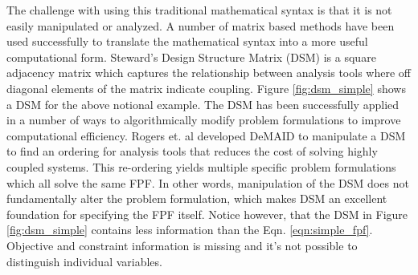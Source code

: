     The challenge with using this traditional mathematical syntax is that it is not easily manipulated or analyzed. 
    A number of matrix based methods have been used successfully to translate the mathematical syntax into a more useful computational form. 
    Steward's Design Structure Matrix (DSM) is a square adjacency matrix which captures the relationship between analysis tools where off 
    diagonal elements of the matrix indicate coupling\cite{Steward1981}. Figure \ref{fig:dsm_simple} shows a DSM for the above notional example. 
    The DSM has been successfully applied in a number of ways to algorithmically modify problem formulations to 
    improve computational efficiency. Rogers et. al developed DeMAID to manipulate a
    DSM  to find an ordering for analysis tools that reduces the cost of solving highly coupled systems\cite{Rogers1996}. This re-ordering yields
    multiple specific problem formulations which all solve the same FPF. In other words, manipulation of the DSM does not fundamentally alter
    the problem formulation, which makes DSM an excellent foundation for specifying the FPF itself. Notice however, that the DSM in 
    Figure \ref{fig:dsm_simple} contains less information than the Eqn. \ref{eqn:simple_fpf}. Objective and constraint information 
    is missing and it's not possible to distinguish individual variables.


